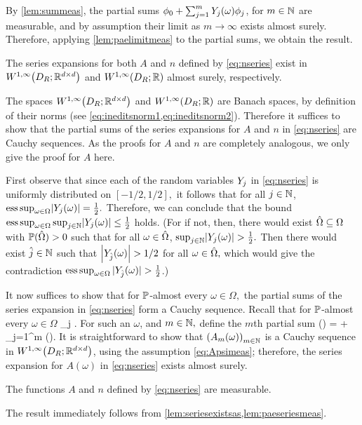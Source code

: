 By \cref{lem:summeas}, the partial sums $\phi_0 + \sum_{j=1}^m Y_{j}(\omega)\phi_j$, for $m \in \mathbb N$ are measurable, and by assumption their limit as $m \rightarrow \infty$ exists almost surely. Therefore, applying \cref{lem:paelimitmeas} to the partial sums, we obtain the result.
\epf

\ble\label{lem:seriesexistsas}
The series expansions for both $A$ and $n$ defined by \eqref{eq:nseries} exist in $\WoiDRRRdtd$ and $\WoiDRRR$ almost surely, respectively.
\ele

The spaces $\WoiDRRRdtd$ and $\WoiDRRR$ are Banach spaces, by definition of their norms (see \cref{eq:ineditsnorm1,eq:ineditsnorm2}). Therefore it suffices to show that the partial sums of the series expansions for $A$ and $n$ in \eqref{eq:nseries} are Cauchy sequences. As the proofs for $A$ and $n$ are completely analogous, we only give the proof for $A$ here.

First observe that since each of the random variables $Y_{j}$ in \eqref{eq:nseries} is uniformly distributed on $[-1/2,1/2],$ it follows that for all $j \in \mathbb N$, $\esssup_{\omega \in \Omega} \abs{\Yj(\omega)} = \frac12.$
Therefore, we can conclude that the bound $\esssup_{\omega \in \Omega} \sup_{j \in \NN} \abs{\Yj(\omega)} \leq \half$ holds.
(For if not, then, there would exist $\hat{\Omega} \subseteq \Omega$ with $\mathbb P(\hat{\Omega}) > 0$ such that for all $\omega \in \hat{\Omega}$, $\sup_{j \in \NN} \abs{\Yj(\omega)} > \half.$
Then there would exist $\hat{j} \in \mathbb N$ such that $\abs{\Yjhat(\omega)} > 1/2$ for all $\omega \in \hat{\Omega},$ which would give the contradiction $\operatorname{ess\,sup}_{\omega \in \Omega} |Y_{\hat{j}}(\omega)| > \frac{1}{2}$.)

It now suffices to show that for $\mathbb P$-almost every $\omega \in \Omega,$ the partial sums of the series expansion in \eqref{eq:nseries} form a Cauchy sequence. Recall that for $\mathbb P$-almost every $\omega \in \Omega$
\beqs
\sup_{j \in \NN} \abs{\Yj(\omega)} \leq \half.
\eeqs
For such an $\omega$, and $m \in \mathbb N,$ define the $m$th partial sum
\beqs
\Am(\omega) = \Az + \sum_{j=1}^m \Yj(\omega)\Psij.
\eeqs
It is straightforward to show that $\mleft(\Am(\omega)\mright)_{m \in \NN}$ is a Cauchy sequence in $\WoiDRRRdtd$, using the assumption \eqref{eq:Apsimeas}; therefore, the series expansion for $A(\omega)$ in \eqref{eq:nseries} exists almost surely.
\epf

\ble\label{lem:seriesmeas}
The functions $A$ and $n$ defined by \eqref{eq:nseries} are measurable.
\ele

The result immediately follows from \cref{lem:seriesexistsas,lem:paeseriesmeas}.
\epf
